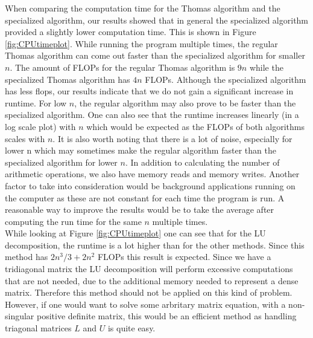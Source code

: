 \documentclass[twocolumn]{aastex62}
\begin{document}
When comparing the computation time for the Thomas algorithm and the specialized algorithm, our results showed that in general the specialized algorithm provided a slightly lower computation time. This is shown in Figure \ref{fig:CPUtimeplot}.  While running the program multiple times, the regular Thomas algorithm can come out faster than the specialized algorithm for smaller $n$.  The amount of FLOPs for the regular Thomas algorithm is $9n$ while the specialized Thomas algorithm has $4n$ FLOPs. Although the specialized algorithm has less flops, our results indicate that we do not gain a significant increase in runtime. For low $n$, the regular algorithm may also prove to be faster than the specialized algorithm. One can also see that the runtime increases linearly (in a log scale plot) with $n$ which would be expected as the FLOPs of both algorithms scales with $n$.  It is also worth noting that there is a lot of noise, especially for lower n which may sometimes make the regular algorithm faster than the specialized algorithm for lower $n$. In addition to calculating the number of arithmetic operations, we also have memory reads and memory writes. Another factor to take into consideration would be background applications running on the computer as these are not constant for each time the program is run. A reasonable way to improve the results would be to take the average after computing the run time for the same $n$ multiple times.\\\indent
While looking at Figure \ref{fig:CPUtimeplot} one can see that for the LU decomposition, the runtime is a lot higher than for the other methods. Since this method has $2n^3/3+2n^2$ FLOPs this result is expected. Since we have a tridiagonal matrix the LU decomposition will perform excessive computations that are not needed, due to the additional memory needed to represent a dense matrix. Therefore this method should not be applied on this kind of problem. However, if one would want to solve some arbritary matrix equation, with a non-singular positive definite matrix, this would be an efficient method as handling triagonal matrices $L$ and $U$ is quite easy. 
\end{document}
